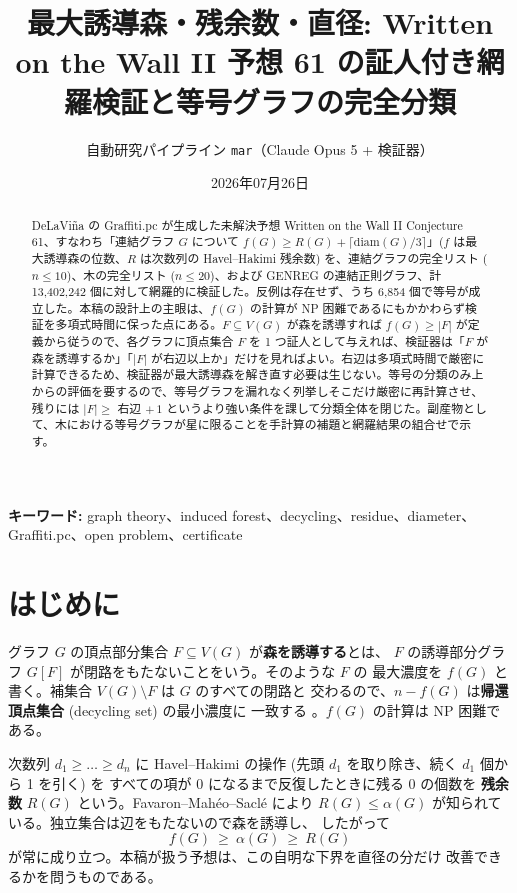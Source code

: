 \documentclass[paper=a4,fontsize=10.5pt,jafontsize=10.5pt]{jlreq}
\title{最大誘導森・残余数・直径: Written on the Wall II 予想 61 の証人付き網羅検証と等号グラフの完全分類}
\author{自動研究パイプライン \texttt{mar}（Claude Opus 5 + 検証器）}
\date{2026年07月26日}
\theoremstyle{plain}
\theoremstyle{definition}
\begin{document}
\maketitle

\begin{abstract}
DeLaViña の Graffiti.pc が生成した未解決予想 Written on the Wall II Conjecture 61、すなわち「連結グラフ $G$ について $f(G) \ge R(G) + \lceil \mathrm{diam}(G)/3 \rceil$」($f$ は最大誘導森の位数、$R$ は次数列の Havel--Hakimi 残余数) を、連結グラフの完全リスト ($n \le 10$)、木の完全リスト ($n \le 20$)、および GENREG の連結正則グラフ、計 13,402,242 個に対して網羅的に検証した。反例は存在せず、うち 6,854 個で等号が成立した。本稿の設計上の主眼は、$f(G)$ の計算が NP 困難であるにもかかわらず検証を多項式時間に保った点にある。$F \subseteq V(G)$ が森を誘導すれば $f(G) \ge |F|$ が定義から従うので、各グラフに頂点集合 $F$ を 1 つ証人として与えれば、検証器は「$F$ が森を誘導するか」「$|F|$ が右辺以上か」だけを見ればよい。右辺は多項式時間で厳密に計算できるため、検証器が最大誘導森を解き直す必要は生じない。等号の分類のみ上からの評価を要するので、等号グラフを漏れなく列挙しそこだけ厳密に再計算させ、残りには $|F| \ge$ 右辺 $+\,1$ というより強い条件を課して分類全体を閉じた。副産物として、木における等号グラフが星に限ることを手計算の補題と網羅結果の組合せで示す。
\end{abstract}

\noindent\textbf{キーワード:} graph theory、induced forest、decycling、residue、diameter、Graffiti.pc、open problem、certificate


\section{はじめに}

グラフ $G$ の頂点部分集合 $F \subseteq V(G)$ が\textbf{森を誘導する}とは、
$F$ の誘導部分グラフ $G[F]$ が閉路をもたないことをいう。そのような $F$ の
最大濃度を $f(G)$ と書く。補集合 $V(G) \setminus F$ は $G$ のすべての閉路と
交わるので、$n - f(G)$ は\textbf{帰還頂点集合} (decycling set) の最小濃度に
一致する \cite{beineke1978}。$f(G)$ の計算は NP 困難である。

次数列 $d_1 \ge \dots \ge d_n$ に Havel--Hakimi の操作
(先頭 $d_1$ を取り除き、続く $d_1$ 個から 1 を引く) を
すべての項が $0$ になるまで反復したときに残る $0$ の個数を
\textbf{残余数} $R(G)$ という。Favaron--Mahéo--Saclé \cite{fms1991} により
$R(G) \le \alpha(G)$ が知られている。独立集合は辺をもたないので森を誘導し、
したがって
\begin{equation}\label{eq:trivial}
f(G) \ \ge \ \alpha(G) \ \ge \ R(G)
\end{equation}
が常に成り立つ。本稿が扱う予想は、この自明な下界を直径の分だけ
改善できるかを問うものである。
\end{document}
